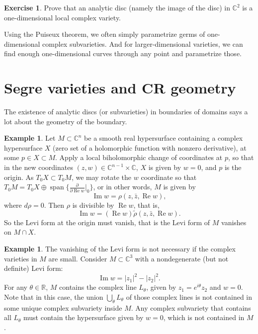 \documentclass[12pt,openany]{book}
\renewcommand{\Re}{\operatorname{Re}}
\renewcommand{\Im}{\operatorname{Im}}
\newcommand{\abs}[1]{\left\lvert {#1} \right\rvert}
\newcommand{\C}{{\mathbb{C}}}
\newcommand{\R}{{\mathbb{R}}}
\newcommand{\sectionnewpage}{}
\theoremstyle{plain}
\theoremstyle{remark}
\theoremstyle{definition}
\newenvironment{exbox}{%
    \def\FrameCommand{\vrule width 1pt \relax\hspace {10pt}}%
    \MakeFramed {\advance \hsize -\width \FrameRestore }%
}{%
    \endMakeFramed
}
\theoremstyle{exercise}
\newtheorem{exercise}{Exercise}[section]
\theoremstyle{example}
\newtheorem{example}[thm]{Example}
\begin{document}
\begin{exbox}
\begin{exercise}
Prove that an analytic disc (namely the image of the disc) in $\C^2$
is a one-dimensional local complex variety.
\end{exercise}
\end{exbox}

Using the Puiseux theorem, we often simply parametrize germs
of one-dimensional complex subvarieties.  
And for larger-dimensional varieties, we can find
enough one-dimensional curves through any point and parametrize those.


\sectionnewpage
\section{Segre varieties and CR geometry} \label{sec:crgeomcr}

The existence of analytic discs (or subvarieties)
in boundaries of domains says a lot about the geometry of the boundary.

\begin{example}
Let $M \subset \C^n$ be a smooth real hypersurface containing
a complex hypersurface $X$ (zero set of a holomorphic function
with nonzero derivative), at some $p \in X \subset M$.
Apply a local biholomorphic change of coordinates at $p$, so
that in the new coordinates
$(z,w) \in \C^{n-1} \times \C$,
$X$ is given by $w=0$, and $p$ is the origin.
As $T_0 X \subset T_0 M$, we may rotate the $w$ coordinate
so that $T_0 M = T_0 X \oplus \operatorname{span} \bigl\{
\frac{\partial}{\partial \Re w}\big|_0 \bigr\}$,
or in other words, $M$ is given by
\begin{equation*}
\Im w = \rho(z,\bar{z},\Re w) ,
\end{equation*}
where $d\rho = 0$.
Then $\rho$
is divisible by $\Re w$, that is,
\begin{equation*}
\Im w = (\Re w) \widetilde{\rho}(z,\bar{z},\Re w)  .
\end{equation*}
So the Levi form at the origin must vanish,
that is the Levi form of $M$ vanishes on $M \cap X$.
\end{example}

\begin{example}
The vanishing of the Levi form is not necessary if the complex varieties in
$M$ are small.  Consider $M\subset \C^3$ with a nondegenerate (but not definite)
Levi form:
\begin{equation*}
\Im w = \abs{z_1}^2-\abs{z_2}^2 .
\end{equation*}
For any $\theta \in \R$,
$M$ contains the complex line $L_\theta$,
given by $z_1 = e^{i\theta} z_2$ and
$w = 0$.  Note that in this case, the union $\bigcup_\theta L_\theta$ of those
complex lines is not
contained in some unique complex subvariety inside $M$.  Any complex
subvariety that contains all $L_\theta$ must contain the hypersurface given
by $w = 0$, which is not contained in $M$.
\end{example}
\end{document}
